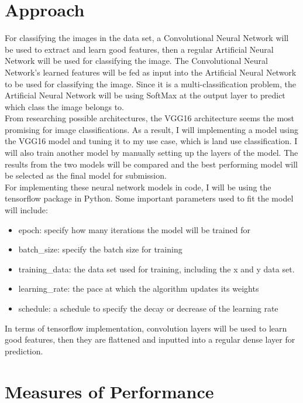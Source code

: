 \documentclass[acmtog]{acmart}
\begin{document}
	\section{Approach}
	
	For classifying the images in the data set, a Convolutional Neural Network will be used to extract and learn good features, then a regular Artificial Neural Network will be used for classifying the image. The Convolutional Neural Network's learned features will be fed as input into the Artificial Neural Network to be used for classifying the image. Since it is a multi-classification problem, the Artificial Neural Network will be using SoftMax at the output layer to predict which class the image belongs to.\\
	From researching possible architectures, the VGG16 architecture seems the most promising for image classifications. As a result, I will implementing a model using the VGG16 model and tuning it to my use case, which is land use classification. I will also train another model by manually setting up the layers of the model. The results from the two models will be compared and the best performing model will be selected as the final model for submission.\\
	For implementing these neural network models in code, I will be using the tensorflow package in Python. Some important parameters used to fit the model will include:
	\begin{itemize}
		\item epoch: specify how many iterations the model will be trained for
		\item batch\_size: specify the batch size for training
		\item training\_data: the data set used for training, including the x and y data set.
		\item learning\_rate: the pace at which the algorithm updates its weights
		\item schedule: a schedule to specify the decay or decrease of the learning rate
	\end{itemize}
	
	In terms of tensorflow implementation, convolution layers will be used to learn good features, then they are flattened and inputted into a regular dense layer for prediction.
	
	
	\section{Measures of Performance}
	
\end{document}
